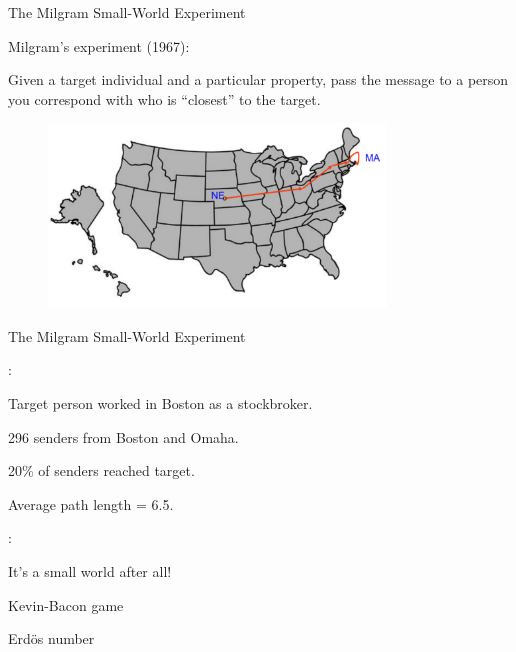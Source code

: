 \begin{frame}{The Milgram Small-World Experiment}

Milgram's experiment (1967):

Given a target individual and a particular property, pass the message to a 
person you correspond with who is “closest” to the target.

\begin{figure}
\includegraphics[width=0.8\textwidth]{figs/08/milgram}
\end{figure}
	
\end{frame}

\begin{frame}{The Milgram Small-World Experiment}
	
:

\BI
\item Target person worked in Boston as a stockbroker.
\item 296 senders from Boston and Omaha.
\item 20\% of senders reached target.
\item Average path length = 6.5.
\EI

\bigskip
{}:

\BI
\item It's a small world after all!
\item Kevin-Bacon game
\item Erd\"os number
\EI

\end{frame}

